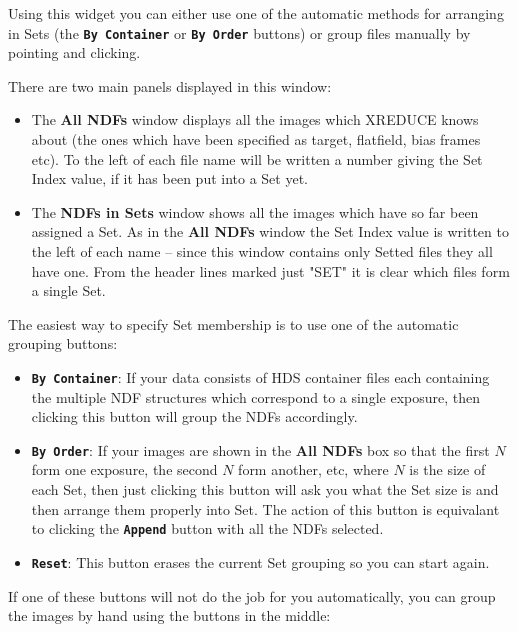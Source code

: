 \documentclass[11pt,nolof]{starlink}
\providecommand{\butt}[1]{{\bf \tt #1}}
\providecommand{\wlab}[1]{{\bf #1}}
\begin{document}
Using this widget you can either use one of the automatic methods
for arranging in Sets (the \butt{By Container} or \butt{By Order} buttons)
or group files manually by pointing and clicking.

There are two main panels displayed in this window:
\begin{itemize}
\item
The \wlab{All NDFs} window displays all the images which XREDUCE
knows about (the ones which have been specified as target, flatfield,
bias frames etc).  To the left of each file name will be written
a number giving the Set Index value, if it has been put into a Set yet.
\item
The \wlab{NDFs in Sets} window shows all the images which have so far
been assigned a Set.  As in the \wlab{All NDFs} window the Set Index
value is written to the left of each name -- since this window contains
only Setted files they all have one.
From the header lines marked just "SET" it is clear which files
form a single Set.
\end{itemize}

The easiest way to specify Set membership is to use one of the
automatic grouping buttons:
\begin{itemize}
\item \butt{By Container}:
If your data consists of HDS container files each containing the
multiple NDF structures which correspond to a single exposure,
then clicking this button will group the NDFs accordingly.
\item \butt{By Order}:
If your images are shown in the \wlab{All NDFs} box  so that
the first $N$ form one exposure, the second $N$ form another,
etc, where $N$ is the size of each Set, then just clicking this
button will ask you what the Set size is and then arrange them
properly into Set.
The action of this button is equivalant to clicking the
\butt{Append} button with all the NDFs selected.
\item \butt{Reset}:
This button erases the current Set grouping so you can start again.
\end{itemize}

If one of these buttons will not do the job for you automatically,
you can group the images by hand using the buttons in the middle:
\end{document}
